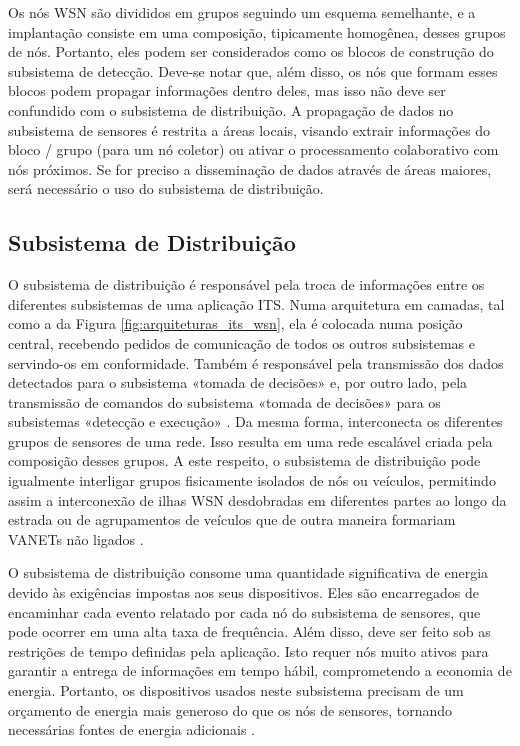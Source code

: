 \documentclass[
	12pt,				%
	oneside,			%
	a4paper,			%
	english,			%
	brazil				%
	]{abntex2ppgsi}
\begin{document}
Os nós WSN são divididos em grupos seguindo um esquema semelhante, e a implantação consiste em uma composição, tipicamente homogênea, desses grupos de nós. Portanto, eles podem ser considerados como os blocos de construção do subsistema de detecção. Deve-se notar que, além disso, os nós que formam esses blocos podem propagar informações dentro deles, mas isso não deve ser confundido com o subsistema de distribuição. A propagação de dados no subsistema de sensores é restrita a áreas locais, visando extrair informações do bloco / grupo (para um nó coletor) ou ativar o processamento colaborativo com nós próximos. Se for preciso a disseminação de dados através de áreas maiores, será necessário o uso do subsistema de distribuição.

\subsection{Subsistema de Distribuição}

O subsistema de distribuição é responsável pela troca de informações entre os diferentes subsistemas de uma aplicação ITS. Numa arquitetura em camadas, tal como a da Figura \ref{fig:arquiteturas_its_wsn}, ela é colocada numa posição central, recebendo pedidos de comunicação de todos os outros subsistemas e servindo-os em conformidade. Também é responsável pela transmissão dos dados detectados para o subsistema «tomada de decisões» e, por outro lado, pela transmissão de comandos do subsistema «tomada de decisões» para os subsistemas «detecção e execução» \cite{sung2007collision}. Da mesma forma, interconecta os diferentes grupos de sensores de uma rede. Isso resulta em uma rede escalável criada pela composição desses grupos. A este respeito, o subsistema de distribuição pode igualmente interligar grupos fisicamente isolados de nós ou veículos, permitindo assim a interconexão de ilhas WSN desdobradas em diferentes partes ao longo da estrada \cite{weingartner2007prototype} ou de agrupamentos de veículos que de outra maneira formariam VANETs não ligados \cite{tripp2010performance} .

O subsistema de distribuição consome uma quantidade significativa de energia devido às exigências impostas aos seus dispositivos. Eles são encarregados de encaminhar cada evento relatado por cada nó do subsistema de sensores, que pode ocorrer em uma alta taxa de frequência. Além disso, deve ser feito sob as restrições de tempo definidas pela aplicação. Isto requer nós muito ativos para garantir a entrega de informações em tempo hábil, comprometendo a economia de energia. Portanto, os dispositivos usados neste subsistema precisam de um orçamento de energia mais generoso do que os nós de sensores, tornando necessárias fontes de energia adicionais \cite{losilla2011comprehensive}.
\end{document}
